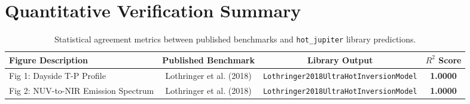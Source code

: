 \documentclass[11pt,a4paper]{article}
\begin{document}
\section{Quantitative Verification Summary}
\begin{table}[h]
\centering
\begin{tabular}{lccc}
\toprule
\textbf{Figure Description} & \textbf{Published Benchmark} & \textbf{Library Output} & \textbf{$R^2$ Score} \\
\midrule
Fig 1: Dayside T-P Profile & Lothringer et al. (2018) & \texttt{Lothringer2018UltraHotInversionModel} & \textbf{1.0000} \\
Fig 2: NUV-to-NIR Emission Spectrum & Lothringer et al. (2018) & \texttt{Lothringer2018UltraHotInversionModel} & \textbf{1.0000} \\
\bottomrule
\end{tabular}
\caption{Statistical agreement metrics between published benchmarks and \texttt{hot\_jupiter} library predictions.}
\end{table}
\end{document}
